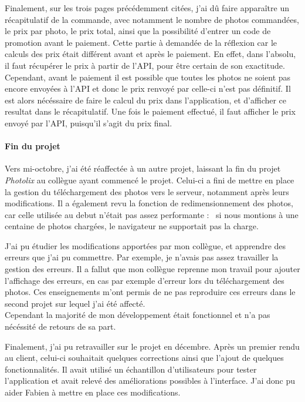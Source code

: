 \bigskip

Finalement, sur les trois pages précédemment citées, j'ai dû faire
apparaître un récapitulatif de la commande, avec notamment le nombre de
photos commandées, le prix par photo, le prix total, ainsi que la
possibilité d'entrer un code de promotion avant le paiement. Cette
partie à demandée de la réflexion car le calculs des prix était
différent avant et après le paiement. En effet, dans l'absolu, il faut
récupérer le prix à partir de l'API, pour être certain de son
exactitude. Cependant, avant le paiement il est possible que toutes les
photos ne soient pas encore envoyées à l'API et donc le prix renvoyé par
celle-ci n'est pas définitif. Il est alors nécéssaire de faire le calcul
du prix dans l'application, et d'afficher ce resultat dans le
récapitulatif. Une fois le paiement effectué, il faut afficher le prix
envoyé par l'API, puisqu'il s'agit du prix final.

\bigskip

\paragraph{Fin du projet}\label{fin-du-projet}

\bigskip

Vers mi-octobre, j'ai été réaffectée à un autre projet, laissant la fin
du projet \emph{Photolix} au collègue ayant commencé le projet. Celui-ci
a fini de mettre en place la gestion du téléchargement des photos vers
le serveur, notamment après leurs modifications. Il a également revu la
fonction de redimensionnement des photos, car celle utilisée au debut
n'était pas assez performante : ~si nous montions à une centaine de
photos chargées, le navigateur ne supportait pas la charge.

\bigskip

J'ai pu étudier les modifications apportées par mon collègue, et
apprendre des erreurs que j'ai pu commettre. Par exemple, je n'avais pas
assez travailler la gestion des erreurs. Il a fallut que mon collègue
reprenne mon travail pour ajouter l'affichage des erreurs, en cas par
exemple d'erreur lors du téléchargement des photos. Ces enseignements
m'ont permis de ne pas reproduire ces erreurs dans le second projet sur
lequel j'ai été affecté.\\
Cependant la majorité de mon développement était fonctionnel et n'a pas
nécéssité de retours de sa part.

\bigskip

Finalement, j'ai pu retravailler sur le projet en décembre. Après un
premier rendu au client, celui-ci souhaitait quelques corrections ainsi
que l'ajout de quelques fonctionnalités. Il avait utilisé un échantillon
d'utilisateurs pour tester l'application et avait relevé des
améliorations possibles à l'interface. J'ai donc pu aider Fabien à
mettre en place ces modifications.

